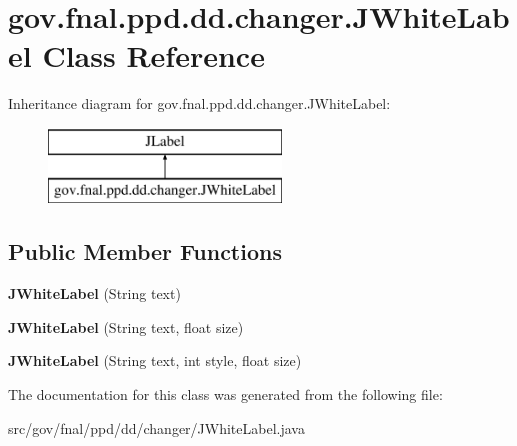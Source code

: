 \hypertarget{classgov_1_1fnal_1_1ppd_1_1dd_1_1changer_1_1JWhiteLabel}{\section{gov.\-fnal.\-ppd.\-dd.\-changer.\-J\-White\-Label Class Reference}
\label{classgov_1_1fnal_1_1ppd_1_1dd_1_1changer_1_1JWhiteLabel}
}
Inheritance diagram for gov.\-fnal.\-ppd.\-dd.\-changer.\-J\-White\-Label\-:\begin{figure}[H]
\begin{center}
\leavevmode
\includegraphics[height=2.000000cm]{classgov_1_1fnal_1_1ppd_1_1dd_1_1changer_1_1JWhiteLabel}
\end{center}
\end{figure}
\subsection*{Public Member Functions}
\begin{DoxyCompactItemize}
\item 
\hypertarget{classgov_1_1fnal_1_1ppd_1_1dd_1_1changer_1_1JWhiteLabel_a712eb7fc613d1dc37704c22de8b9b5c7}{{\bfseries J\-White\-Label} (String text)}\label{classgov_1_1fnal_1_1ppd_1_1dd_1_1changer_1_1JWhiteLabel_a712eb7fc613d1dc37704c22de8b9b5c7}

\item 
\hypertarget{classgov_1_1fnal_1_1ppd_1_1dd_1_1changer_1_1JWhiteLabel_acc7bfdc750cc99a00d9b5b0ca5776793}{{\bfseries J\-White\-Label} (String text, float size)}\label{classgov_1_1fnal_1_1ppd_1_1dd_1_1changer_1_1JWhiteLabel_acc7bfdc750cc99a00d9b5b0ca5776793}

\item 
\hypertarget{classgov_1_1fnal_1_1ppd_1_1dd_1_1changer_1_1JWhiteLabel_a1bfe2fecadaa8dd8350e3c443118df87}{{\bfseries J\-White\-Label} (String text, int style, float size)}\label{classgov_1_1fnal_1_1ppd_1_1dd_1_1changer_1_1JWhiteLabel_a1bfe2fecadaa8dd8350e3c443118df87}

\end{DoxyCompactItemize}


The documentation for this class was generated from the following file\-:\begin{DoxyCompactItemize}
\item 
src/gov/fnal/ppd/dd/changer/J\-White\-Label.\-java\end{DoxyCompactItemize}
